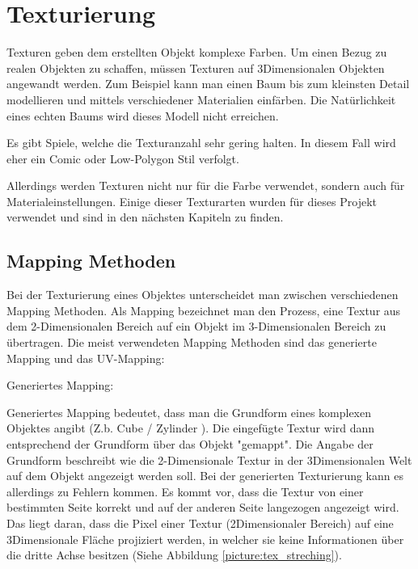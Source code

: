 \section{Texturierung}
\label{sec:tex}
Texturen geben dem erstellten Objekt komplexe Farben. Um einen Bezug zu realen Objekten zu schaffen, müssen Texturen
auf 3Dimensionalen Objekten angewandt werden. Zum Beispiel kann man einen Baum bis
zum kleinsten Detail modellieren und mittels verschiedener Materialien einfärben. Die Natürlichkeit
eines echten Baums wird dieses Modell nicht erreichen.

Es gibt Spiele, welche die Texturanzahl sehr gering halten. In diesem Fall wird eher ein Comic
oder Low-Polygon Stil verfolgt.

Allerdings werden Texturen nicht nur für die Farbe verwendet, sondern auch für Materialeinstellungen.
Einige dieser Texturarten wurden für dieses Projekt verwendet und
sind in den nächsten Kapiteln zu finden.

\subsection{Mapping Methoden}
\label{sec:tex_mapping}

Bei der Texturierung eines Objektes unterscheidet man zwischen verschiedenen Mapping Methoden. Als Mapping bezeichnet man
den Prozess, eine Textur aus dem 2-Dimensionalen Bereich auf ein Objekt im 3-Dimensionalen Bereich zu übertragen. Die
meist verwendeten Mapping Methoden sind das generierte Mapping und das UV-Mapping\citep{blender:tex_mapping_modes}:


Generiertes Mapping:

Generiertes Mapping bedeutet, dass man die Grundform eines komplexen Objektes angibt (Z.b. Cube / Zylinder ). Die
eingefügte Textur wird dann entsprechend der Grundform über das Objekt "gemappt". Die Angabe der Grundform beschreibt
wie die 2-Dimensionale Textur in der 3Dimensionalen Welt auf dem Objekt angezeigt werden soll.
Bei der generierten Texturierung kann es allerdings zu Fehlern kommen. Es kommt vor, dass die Textur von einer
bestimmten Seite korrekt und auf der anderen Seite langezogen angezeigt wird. Das liegt daran, dass die Pixel einer
Textur (2Dimensionaler Bereich) auf eine 3Dimensionale Fläche projiziert werden, in welcher sie keine Informationen
über die dritte Achse besitzen (Siehe Abbildung \ref{picture:tex_streching}).

